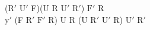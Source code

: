 ($\text{R}'$ $\text{U}'$ F)(U R $\text{U}'$ $\text{R}'$) $\text{F}'$ R\\
$\text{y}'$ (F $\text{R}'$ $\text{F}'$ R) U R (U $\text{R}'$ $\text{U}'$ R) $\text{U}'$ $\text{R}'$\\
